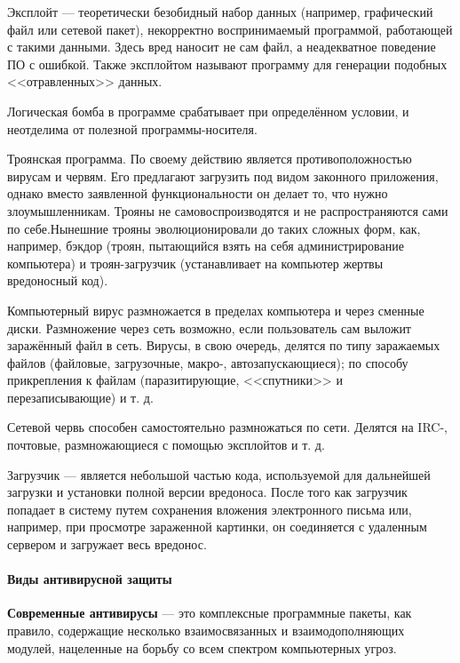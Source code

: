 \begin{Notes}
  \item Эксплойт --- теоретически безобидный набор данных (например,
      графический файл или сетевой пакет), некорректно воспринимаемый
      программой, работающей с такими данными. Здесь вред наносит не сам
      файл, а неадекватное поведение ПО с ошибкой. Также эксплойтом
      называют программу для генерации подобных <<отравленных>> данных.
  \item Логическая бомба в программе срабатывает при определённом условии, и
неотделима от полезной программы-носителя.
  \item Троянская программа. По своему действию является противоположностью вирусам и
червям. Его предлагают загрузить под видом законного приложения, однако
вместо заявленной функциональности он делает то, что нужно злоумышленникам.
Трояны не самовоспроизводятся и не распространяются сами по себе.Нынешние
трояны эволюционировали до таких сложных форм, как, например, бэкдор (троян,
пытающийся взять на себя администрирование компьютера) и троян-загрузчик
(устанавливает на компьютер жертвы вредоносный код).
  \item Компьютерный вирус размножается в пределах компьютера и через сменные диски.
Размножение через сеть возможно, если пользователь сам выложит заражённый
файл в сеть. Вирусы, в свою очередь, делятся по типу заражаемых файлов
(файловые, загрузочные, макро-, автозапускающиеся); по способу прикрепления к
файлам (паразитирующие, <<спутники>> и перезаписывающие) и т. д.
  \item Сетевой червь способен самостоятельно размножаться по сети. Делятся на IRC-,
почтовые, размножающиеся с помощью эксплойтов и т. д.
  \item Загрузчик --- является небольшой частью кода, используемой для дальнейшей
загрузки и установки полной версии вредоноса. После того как загрузчик
попадает в систему путем сохранения вложения электронного письма или,
например, при просмотре зараженной картинки, он соединяется с удаленным
сервером и загружает весь вредонос.
\end{Notes}
%
\paragraph{Виды антивирусной защиты}
%
\textbf{Современные антивирусы} --- это комплексные программные пакеты, как
правило, содержащие несколько взаимосвязанных и взаимодополняющих модулей,
нацеленные на борьбу со всем спектром компьютерных угроз.

